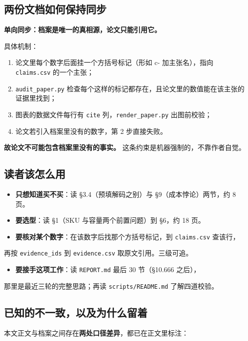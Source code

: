 \subsection{两份文档如何保持同步}

\textbf{单向同步：档案是唯一的真相源，论文只能引用它。}


具体机制：


\begin{enumerate}
  \item 论文里每个数字后面挂一个方括号标记（形如 c- 加主张名），指向 \texttt{claims.csv} 的一个主张；
  \item \texttt{audit\_paper.py} 检查每个这样的标记都存在，且论文里的数值能在该主张的证据里找到；
  \item 图表的数据文件每行有 \texttt{cite} 列，\texttt{render\_paper.py} 出图前校验；
  \item 论文若引入档案里没有的数字，第 2 步直接失败。
\end{enumerate}

\textbf{故论文不可能包含档案里没有的事实。} 这条约束是机器强制的，不靠作者自觉。


\subsection{读者该怎么用}

\begin{itemize}
  \item \textbf{只想知道买不买}：读 §3.4（预填解码之别）与 §9（成本悖论）两节，约 8 页。
  \item \textbf{要选型}：读 §1（SKU 与容量两个前置问题）到 §6，约 18 页。
  \item \textbf{要核对某个数字}：在该数字后找那个方括号标记，到 \texttt{claims.csv} 查该行，
\end{itemize}
  再按 \texttt{evidence\_ids} 到 \texttt{evidence.csv} 取原文引用。三级可追。

\begin{itemize}
  \item \textbf{要接手这项工作}：读 \texttt{REPORT.md} 最后 30 节（§10.666 之后），
\end{itemize}
  那里是最近三轮的完整思路；再读 \texttt{scripts/README.md} 了解四道校验。


\subsection{已知的不一致，以及为什么留着}

本文正文与档案之间存在\textbf{两处口径差异}，都已在正文里标注：


